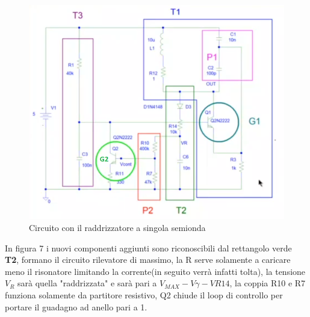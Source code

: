 \documentclass{article}
\begin{document}
~\begin{figure}[H]
\includegraphics[scale=0.9]{RSS.png}
\centering
\caption{Circuito con il raddrizzatore a singola semionda}
\label{fig:foo}
\end{figure}
In figura 7 i nuovi componenti aggiunti sono riconoscibili dal rettangolo verde \textbf{T2}, formano il circuito rilevatore di massimo, la R serve solamente a caricare meno il risonatore limitando la corrente(in seguito verrà infatti tolta), la tensione $V_R$ sarà quella "raddrizzata" e sarà pari a $V_{MAX}-V\gamma-VR14$, la coppia R10 e R7 funziona solamente da partitore resistivo, Q2 chiude il loop di controllo per portare il guadagno ad anello pari a 1.
\end{document}
